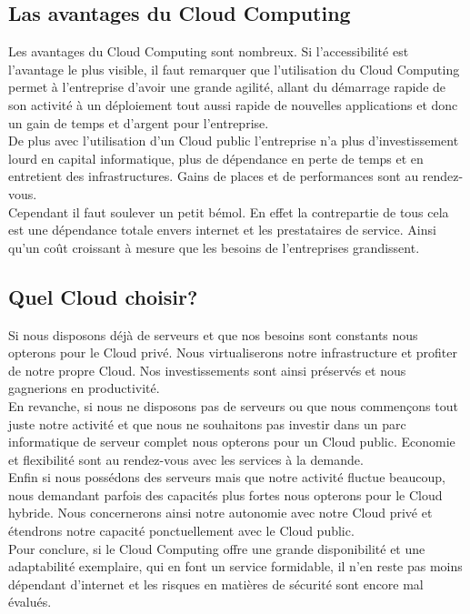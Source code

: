  \subsection{Las avantages du Cloud Computing}
  Les avantages du Cloud Computing sont nombreux. Si l’accessibilité est l’avantage le plus visible, il faut remarquer que l’utilisation du Cloud Computing permet à l’entreprise d’avoir une grande agilité, allant du démarrage rapide de son activité à un déploiement tout aussi rapide de nouvelles applications et donc un gain de temps et d’argent pour l’entreprise.\\

  De plus avec l’utilisation d’un Cloud public l’entreprise n’a plus d’investissement lourd en capital informatique, plus de dépendance en perte de temps et en entretient des infrastructures. Gains de places et de performances sont au rendez-vous.\\

  Cependant il faut soulever un petit bémol. En effet la contrepartie de tous cela est une dépendance totale envers internet et les prestataires de service. Ainsi qu’un coût croissant à mesure que les besoins de l’entreprises grandissent.

  \subsection{Quel Cloud choisir?}
  Si nous disposons déjà de serveurs et que nos besoins sont constants nous opterons pour le Cloud privé. Nous virtualiserons notre infrastructure et profiter de notre propre Cloud. Nos investissements sont ainsi préservés et nous gagnerions en productivité.\\

  En revanche, si nous ne disposons pas de serveurs ou que nous commençons tout juste notre activité et que nous ne souhaitons pas investir dans un parc informatique de serveur complet nous opterons pour un Cloud public. Economie et flexibilité sont au rendez-vous avec les services à la demande.\\

  Enfin si nous possédons des serveurs mais que notre activité fluctue beaucoup, nous demandant parfois des capacités plus fortes nous opterons pour le Cloud hybride. Nous concernerons ainsi notre autonomie avec notre Cloud privé et étendrons notre capacité ponctuellement avec le Cloud public.\\

  Pour conclure, si le Cloud Computing offre une grande disponibilité et une adaptabilité exemplaire, qui en font un service formidable, il n’en reste pas moins dépendant d’internet et les risques en matières de sécurité sont encore mal évalués.
